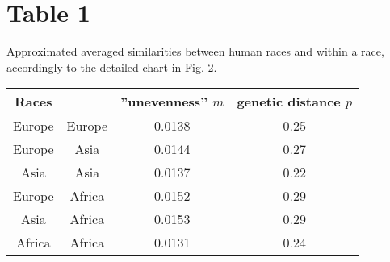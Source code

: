 \documentclass[a4paper]{article}
\begin{document}
\newpage

\section*{Table 1}

Approximated averaged similarities between human races and within a race, accordingly to the detailed chart in Fig. 2.

\vskip 5pt

\begin{tabular}{cccc}
 Races & &''unevenness'' $m$ &genetic distance $p$\\
\hline
Europe&Europe&0.0138&0.25\\
Europe&Asia&0.0144&0.27\\
Asia&Asia&0.0137&0.22\\
Europe&Africa&0.0152&0.29\\
Asia&Africa&0.0153&0.29\\
Africa&Africa&0.0131&0.24\\
\hline
\end{tabular}
\end{document}
